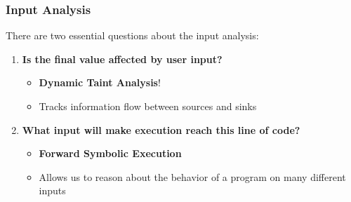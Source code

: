 \begin{frame}
	\frametitle{Input Analysis}
	There are two essential questions about the input analysis: \newline
	\begin{enumerate}
		\item<2-> \textbf{Is the final value affected by user input?}
		\begin{itemize}
			\item \textbf{Dynamic Taint Analysis}!
			\item Tracks information flow between sources and sinks
		\end{itemize}
		\item<3-> \textbf{What input will make execution reach this line of code?}
		\begin{itemize}
			\item \textbf{Forward Symbolic Execution}
			\item Allows us to reason about the behavior of a program on many different inputs
		\end{itemize}
	\end{enumerate}
\end{frame}